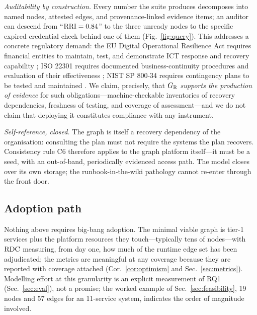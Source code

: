 \emph{Auditability by construction.} Every number the suite produces decomposes into named nodes, attested edges, and provenance-linked evidence items; an auditor can descend from ``$\mathrm{RRI} = 0.84$'' to the three unready nodes to the specific expired credential check behind one of them (Fig.~\ref{fig:query}). This addresses a concrete regulatory demand: the EU Digital Operational Resilience Act requires financial entities to maintain, test, and demonstrate ICT response and recovery capability \citep{eu2022dora}; ISO 22301 requires documented business-continuity procedures and evaluation of their effectiveness \citep{iso22301,iso22317}; NIST SP 800-34 requires contingency plans to be tested and maintained \citep{nist2010contingency}. We claim, precisely, that $G_{\mathrm{R}}$ \emph{supports the production of evidence} for such obligations---machine-checkable inventories of recovery dependencies, freshness of testing, and coverage of assessment---and we do not claim that deploying it constitutes compliance with any instrument.

\emph{Self-reference, closed.} The graph is itself a recovery dependency of the organisation: consulting the plan must not require the systems the plan recovers. Consistency rule C6 therefore applies to the graph platform itself---it must be a seed, with an out-of-band, periodically evidenced access path. The model closes over its own storage; the runbook-in-the-wiki pathology cannot re-enter through the front door.

\subsection{Adoption path}
Nothing above requires big-bang adoption. The minimal viable graph is tier-1 services plus the platform resources they touch---typically tens of nodes---with $\mathrm{RDC}$ measuring, from day one, how much of the runtime edge set has been adjudicated; the metrics are meaningful at any coverage because they are reported with coverage attached (Cor.~\ref{cor:optimism} and Sec.~\ref{sec:metrics}). Modelling effort at this granularity is an explicit measurement of RQ1 (Sec.~\ref{sec:eval}), not a promise; the worked example of Sec.~\ref{sec:feasibility}, 19 nodes and 57 edges for an 11-service system, indicates the order of magnitude involved.
